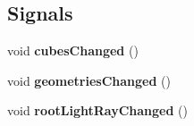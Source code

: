 \subsection*{Signals}
\begin{DoxyCompactItemize}
\item 
\hypertarget{class_scene_a9c23e7cda34a3089165ce18c2ec89c15}{}void {\bfseries cubes\+Changed} ()\label{class_scene_a9c23e7cda34a3089165ce18c2ec89c15}

\item 
\hypertarget{class_scene_a8df7e2ef0bf2910fa03df1c16b255551}{}void {\bfseries geometries\+Changed} ()\label{class_scene_a8df7e2ef0bf2910fa03df1c16b255551}

\item 
\hypertarget{class_scene_a4eed91c96f13a7646830737b820755c4}{}void {\bfseries root\+Light\+Ray\+Changed} ()\label{class_scene_a4eed91c96f13a7646830737b820755c4}

\end{DoxyCompactItemize}
